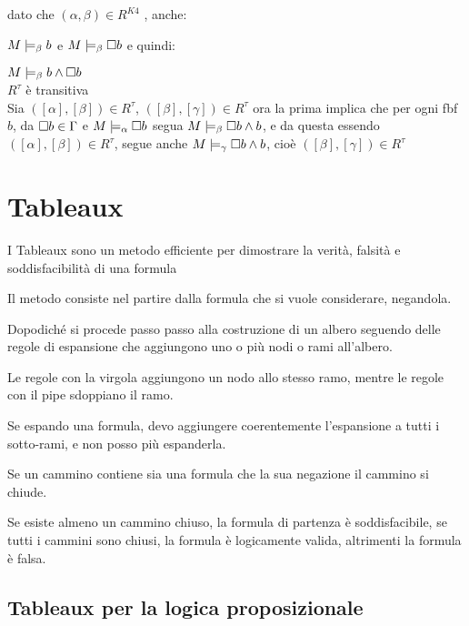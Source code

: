 dato che $(\alpha,\beta)\in R^{K4}$ , anche:

$M\models_{\beta}b$ e $M\models_{\beta}\square b$ e quindi:

$M\models_{\beta}b\wedge\square b$\\


$R^{\tau}$ è transitiva\\


Sia $([\alpha],[\beta])\in R^{\tau}$, $([\beta],[\gamma])\in R^{\tau}$
ora la prima implica che per ogni fbf $b$, da $\square b\in\Gamma$
e $M\models_{\alpha}\square b$ segua $M\models_{\beta}\square b\wedge b$,
e da questa essendo $([\alpha],[\beta])\in R^{\tau}$, segue anche
$M\models_{\gamma}\square b\wedge b$, cioè $([\beta],[\gamma])\in R^{\tau}$


\section{Tableaux}

I Tableaux sono un metodo efficiente per dimostrare la verità, falsità
e soddisfacibilità di una formula

Il metodo consiste nel partire dalla formula che si vuole considerare,
negandola.

Dopodiché si procede passo passo alla costruzione di un albero seguendo
delle regole di espansione che aggiungono uno o più nodi o rami all'albero.

Le regole con la virgola aggiungono un nodo allo stesso ramo, mentre
le regole con il pipe sdoppiano il ramo.

Se espando una formula, devo aggiungere coerentemente l'espansione
a tutti i sotto-rami, e non posso più espanderla.

Se un cammino contiene sia una formula che la sua negazione il cammino
si chiude.

Se esiste almeno un cammino chiuso, la formula di partenza è soddisfacibile,
se tutti i cammini sono chiusi, la formula è logicamente valida, altrimenti
la formula è falsa.


\subsection{Tableaux per la logica proposizionale}

